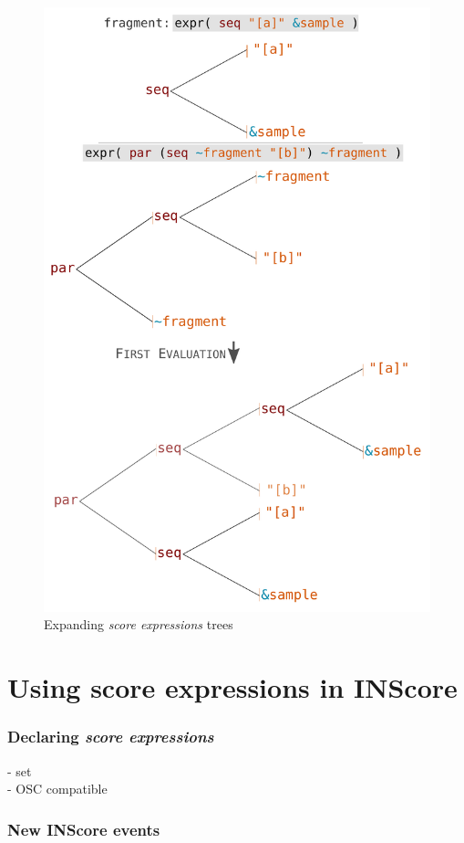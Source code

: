 \documentclass{article}
\newcommand{\sExpr}{\emph{score expressions} }
\begin{document}
\begin{figure}[th]
\centering
\includegraphics[width=0.9\columnwidth]{imgs/expandingTree}
\caption{Expanding \sExpr trees
\label{fig:example}}
\end{figure}

\section{Using score expressions in INScore}
\subsubsection{Declaring \sExpr}
- set \\
- OSC compatible
\subsubsection{New INScore events}
\end{document}
